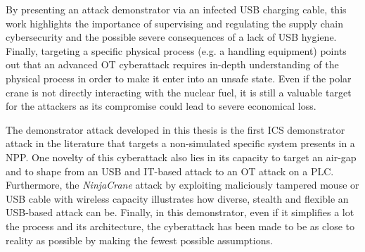 
By presenting an attack demonstrator via an infected USB charging cable, this work highlights the importance of supervising and regulating the supply chain cybersecurity and the possible severe consequences of a lack of USB hygiene. Finally, targeting a specific physical process (e.g. a handling equipment) points out that an advanced OT cyberattack requires in-depth understanding of the physical process in order to make it enter into an unsafe state. Even if the polar crane is not directly interacting with the nuclear fuel, it is still a valuable target for the attackers as its compromise could lead to severe economical loss.

The demonstrator attack developed in this thesis is the first ICS demonstrator attack in the literature that targets a non-simulated specific system presents in a NPP. One novelty of this cyberattack also lies in its capacity to target an air-gap and to shape from an USB and IT-based attack to an OT attack on a PLC. Furthermore, the \emph{NinjaCrane} attack by exploiting maliciously tampered mouse or USB cable with wireless capacity illustrates how diverse, stealth and flexible an USB-based attack can be. Finally, in this demonstrator, even if it simplifies a lot the process and its architecture, the cyberattack has been made to be as close to reality as possible by making the fewest possible assumptions. 


\iffalse

STPA-SafeSec: Safety and security analysis for cyber-physical systems \cite{FRIEDBERG2017183}

https://ieeexplore.ieee.org/document/10032670

https://hitcon.org/2021/agenda/b128a44d-c492-410f-b04c-045548ce0590/Debacle%

https://conference.hitb.org/hitbsecconf2021sin/materials/D1T2%

https://dl.acm.org/doi/abs/10.1007/978-3-031-09234-3_18

https://conferences.iaea.org/event/181/contributions/15925/attachments/8547/11382/IAEA-CN-278-619_SUCHORAB_et_al.pdf

https://github.com/theralfbrown/smod-1

https://www.artemiosv.info/hosted/ModbusFuzzer.pdf

https://www.researchgate.net/profile/Mehdi-Sabraoui/publication/290732323_MODBUS_protocol_fuzzing_for_cyber-security_evaluation_of_industrial_control_systems/links/5d03a22ca6fdcc39f11806ff/MODBUS-protocol-fuzzing-for-cyber-security-evaluation-of-industrial-control-systems.pdf?origin=publication_detail

https://github.com/M3m3M4n/modbus-fuzz-note

\fi